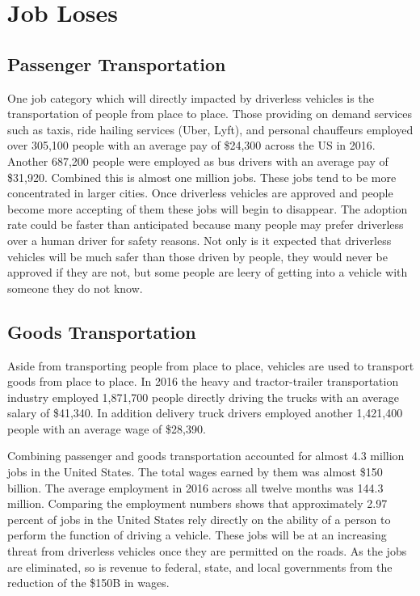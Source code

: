 \documentclass[sigconf]{acmart}
\begin{document}
\section{Job Loses}
\subsection{Passenger Transportation}

One job category which will directly impacted by driverless vehicles is the 
transportation of people from place to place.  Those providing on demand 
services such as taxis, ride hailing services (Uber, Lyft), and personal 
chauffeurs employed over 305,100 people with an average pay of \$24,300 across 
the US in 2016.\cite{BLSOnDemandDrivers}  Another 687,200 people were employed 
as bus drivers with an average pay of \$31,920.\cite{BLSBusDrivers}  Combined 
this is almost one million jobs.  These jobs tend to be more concentrated in 
larger cities.  Once driverless vehicles are approved and people become more 
accepting of them these jobs will begin to disappear.  The adoption rate could 
be faster than anticipated because many people may prefer driverless over a 
human driver for safety reasons.  Not only is it expected that driverless 
vehicles will be much safer than those driven by people, they would never be 
approved if they are not, but some people are leery of getting into a vehicle 
with someone they do not know.  
  
\subsection{Goods Transportation}

Aside from transporting people from place to place, vehicles are used to 
transport goods from place to place.  In 2016 the heavy and tractor-trailer 
transportation industry employed 1,871,700 people directly driving the trucks 
with an average salary of \$41,340.\cite{BLSBigTrucks}  In addition delivery 
truck drivers employed another 1,421,400 people with an average wage of 
\$28,390.\cite{BLSDeliveryDrivers}  

Combining passenger and goods transportation accounted for almost 4.3 million 
jobs in the United States.  The total wages earned by them was almost \$150 
billion.  The average employment in 2016 across all twelve months was 144.3 
million.\cite{BLSUSEmployment}  Comparing the employment numbers shows that 
approximately 2.97 percent of jobs in the United States rely directly on the 
ability of a person to perform the function of driving a vehicle.  These jobs 
will be at an increasing threat from driverless vehicles once they are 
permitted on the roads.  As the jobs are eliminated, so is revenue to federal, 
state, and local governments from the reduction of the \$150B in wages.
\end{document}

